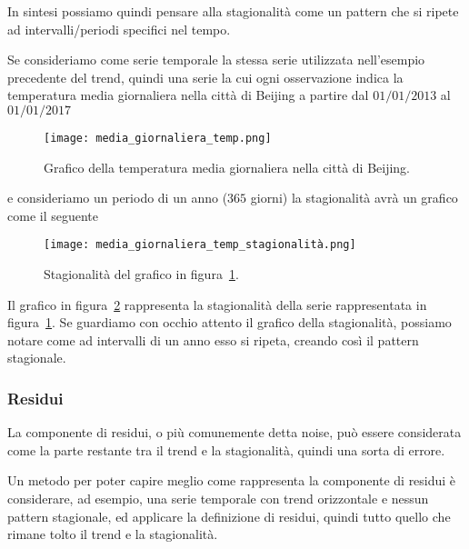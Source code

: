 In sintesi possiamo quindi pensare alla stagionalità come un pattern che si ripete ad 
intervalli/periodi specifici nel tempo.


\begin{esempio} 

    Se consideriamo come serie temporale la stessa serie utilizzata 
    nell'esempio precedente del trend, quindi una serie la cui 
    ogni osservazione indica la temperatura media giornaliera  
    nella città di Beijing a partire dal $01/01/2013$ al $01/01/2017$

    \begin{figure}[H]
        \centering
        \texttt{[image: media\_giornaliera\_temp.png]}
        \caption{Grafico della temperatura media giornaliera nella città di Beijing.}
        \label{fig:media_giornaliera_temp2}
    \end{figure}

    e consideriamo un periodo di un anno ($365$ giorni) la stagionalità avrà un grafico
    come il seguente

    \begin{figure}[H]
        \centering
        \texttt{[image: media\_giornaliera\_temp\_stagionalità.png]}
        \caption{Stagionalità del grafico in figura~\ref{fig:media_giornaliera_temp2}.}
        \label{fig:media_giornaliera_temp_stag}
    \end{figure}

    Il grafico in figura~\ref{fig:media_giornaliera_temp_stag} rappresenta la stagionalità
    della serie rappresentata in figura~\ref{fig:media_giornaliera_temp2}.
    Se guardiamo con occhio attento il grafico della stagionalità, possiamo notare come
    ad intervalli di un anno esso si ripeta, creando così il pattern stagionale.

\end{esempio}


\subsubsection{Residui}
La componente di residui, o più comunemente detta noise, può essere considerata come
la parte restante tra il trend e la stagionalità, quindi una sorta di errore.

Un metodo per poter capire meglio come rappresenta la componente di residui 
è considerare, ad esempio, una serie temporale con trend orizzontale e nessun pattern
stagionale, ed applicare la definizione di residui, quindi tutto quello che rimane
tolto il trend e la stagionalità.


